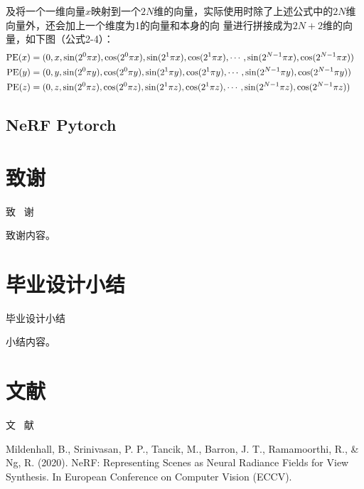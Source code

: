 \documentclass{nwputhesis}
\begin{document}
\indent
及将一个一维向量$x$映射到一个$2N$维的向量，实际使用时除了上述公式中的$2N$维向量外，还会加上一个维度为1的向量和本身的向
量进行拼接成为$2N+2$维的向量，如下图（公式2-4）：
\begin{equation}
    \begin{aligned}
        \text{PE}(x) &= (0, x, \sin(2^0\pi x), \cos(2^0\pi x), \sin(2^1\pi x), \cos(2^1\pi x), \cdots, \sin(2^{N-1}\pi x), \cos(2^{N-1}\pi x))\endline
        \text{PE}(y) &= (0, y, \sin(2^0\pi y), \cos(2^0\pi y), \sin(2^1\pi y), \cos(2^1\pi y), \cdots, \sin(2^{N-1}\pi y), \cos(2^{N-1}\pi y))\endline
        \text{PE}(z) &= (0, z, \sin(2^0\pi z), \cos(2^0\pi z), \sin(2^1\pi z), \cos(2^1\pi z), \cdots, \sin(2^{N-1}\pi z), \cos(2^{N-1}\pi z))\endline
    \end{aligned}
\end{equation}
\makespace

\subsection{NeRF Pytorch}
\section*{致谢}
\begin{center}
    { \blackti \fontsize{16.0600pt}{1.25}致 \, 谢}
\end{center}
致谢内容。

\section*{毕业设计小结}
\makespace
\begin{center}
    { \blackti \fontsize{16.0600pt}{1.25}毕业设计小结}
\end{center}
小结内容。

\makespace
\section*{文献}
\begin{center}
    { \blackti \fontsize{16.0600pt}{1.25}文 \, 献}
\end{center}
\noindent
Mildenhall, B., Srinivasan, P. P., Tancik, M., Barron, J. T., Ramamoorthi, R., \& Ng, R. (2020). NeRF: 
Representing Scenes as Neural Radiance Fields for View Synthesis. In European Conference on Computer Vision 
(ECCV).\\
\end{document}
